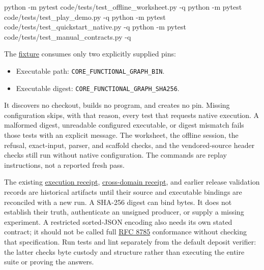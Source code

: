 \documentclass[
  11pt,
]{article}
\newenvironment{Shaded}{}{}
\newcommand{\FunctionTok}[1]{\textcolor[rgb]{0.02,0.16,0.49}{#1}}
\newcommand{\NormalTok}[1]{#1}
\newcommand{\OperatorTok}[1]{\textcolor[rgb]{0.40,0.40,0.40}{#1}}
\providecommand{\tightlist}{%
  \setlength{\itemsep}{0pt}\setlength{\parskip}{0pt}}
\begin{document}
\begin{Shaded}
\begin{Highlighting}[]
\NormalTok{python }\OperatorTok{{-}}\NormalTok{m pytest code}\OperatorTok{/}\NormalTok{tests}\OperatorTok{/}\NormalTok{test\_offline\_worksheet}\OperatorTok{.}\FunctionTok{py} \OperatorTok{{-}}\NormalTok{q}
\NormalTok{python }\OperatorTok{{-}}\NormalTok{m pytest code}\OperatorTok{/}\NormalTok{tests}\OperatorTok{/}\NormalTok{test\_play\_demo}\OperatorTok{.}\FunctionTok{py} \OperatorTok{{-}}\NormalTok{q}
\NormalTok{python }\OperatorTok{{-}}\NormalTok{m pytest code}\OperatorTok{/}\NormalTok{tests}\OperatorTok{/}\NormalTok{test\_quickstart\_native}\OperatorTok{.}\FunctionTok{py} \OperatorTok{{-}}\NormalTok{q}
\NormalTok{python }\OperatorTok{{-}}\NormalTok{m pytest code}\OperatorTok{/}\NormalTok{tests}\OperatorTok{/}\NormalTok{test\_manual\_contracts}\OperatorTok{.}\FunctionTok{py} \OperatorTok{{-}}\NormalTok{q}
\end{Highlighting}
\end{Shaded}

The \href{code/tests/conftest.py}{fixture} consumes only two explicitly
supplied pins:

\begin{itemize}
\tightlist
\item
  Executable path: \texttt{CORE\_FUNCTIONAL\_GRAPH\_BIN}.
\item
  Executable digest: \texttt{CORE\_FUNCTIONAL\_GRAPH\_SHA256}.
\end{itemize}

It discovers no checkout, builds no program, and creates no pin. Missing
configuration skips, with that reason, every test that requests native
execution. A malformed digest, unreadable configured executable, or
digest mismatch fails those tests with an explicit message. The
worksheet, the offline session, the refusal, exact-input, parser, and
scaffold checks, and the vendored-source header checks still run without
native configuration. The commands are replay instructions, not a
reported fresh pass.

The existing \href{code/paper_033_execution_receipt.json}{execution
receipt}, \href{code/cross_domain_symbol_game_receipt.json}{cross-domain
receipt}, and earlier release validation records are historical
artifacts until their source and executable bindings are reconciled with
a new run. A SHA-256 digest can bind bytes. It does not establish their
truth, authenticate an unsigned producer, or supply a missing
experiment. A restricted sorted-JSON encoding also needs its own stated
contract; it should not be called full
\href{https://www.rfc-editor.org/rfc/rfc8785}{RFC 8785} conformance
without checking that specification. Run tests and lint separately from
the default deposit verifier: the latter checks byte custody and
structure rather than executing the entire suite or proving the answers.
\end{document}
